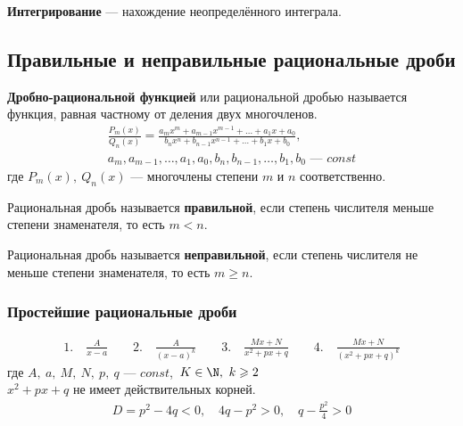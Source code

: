 \begin{definition}
    \textbf{Интегрирование} --- нахождение неопределённого интеграла.
\end{definition}

\subsection{Правильные и неправильные рациональные дроби}

\begin{definition}
    \textbf{Дробно-рациональной функцией} или рациональной дробью называется функция, равная частному от деления двух многочленов.
    \begin{gather*}
        \frac{P_m(x)}{Q_n(x)} = \frac{a_mx^m + a_{m-1}x^{m-1} + \ldots + a_1x + a_0}{b_nx^n + b_{n-1}x^{n-1} + \ldots + b_1x + b_0},\\
        a_m, a_{m-1}, \ldots, a_1, a_0, b_n, b_{n-1}, \ldots, b_1, b_0 \text{ --- } const
    \end{gather*}
    где $P_m(x),\ Q_n(x)$ --- многочлены степени $m$ и $n$ соответственно.
\end{definition}

\begin{definition}
    Рациональная дробь называется \textbf{правильной}, если степень числителя меньше степени знаменателя, то есть $m < n$.
\end{definition}

\begin{definition}
    Рациональная дробь называется \textbf{неправильной}, если степень числителя не меньше степени знаменателя, то есть $m \geqslant n$.
\end{definition}

\subsubsection{Простейшие рациональные дроби}

\begin{gather*}
            1.\quad \frac{A}{x - a}\qquad
            2.\quad \frac{A}{(x-a)^k}\qquad
            3.\quad \frac{Mx + N}{x^2 + px + q}\qquad
            4.\quad \frac{Mx + N}{(x^2 + px + q)^k}
\end{gather*}
где $A,\ a,\ M,\ N,\ p,\ q$ --- $const$,\ $K\in \N,\ k \geqslant 2$\\
$x^2 + px + q$ не имеет действительных корней.
\begin{gather*}
    D = p^2 - 4q < 0,\quad 4q - p^2 > 0,\quad \boxed{q - \frac{p^2}{4} > 0} \tag{$*$}
\end{gather*}

